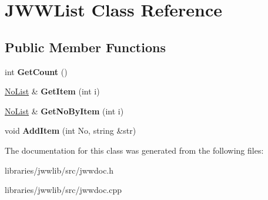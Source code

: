 \hypertarget{classJWWList}{\section{J\-W\-W\-List Class Reference}
\label{classJWWList}
}
\subsection*{Public Member Functions}
\begin{DoxyCompactItemize}
\item 
\hypertarget{classJWWList_af23137dc07751d737ea3837152284cf3}{int {\bfseries Get\-Count} ()}\label{classJWWList_af23137dc07751d737ea3837152284cf3}

\item 
\hypertarget{classJWWList_accb69e0d39b22f00d1a49da19d67a93f}{\hyperlink{struct__NoList}{No\-List} \& {\bfseries Get\-Item} (int i)}\label{classJWWList_accb69e0d39b22f00d1a49da19d67a93f}

\item 
\hypertarget{classJWWList_a7d163cbc45f06507ca9670d297b1ba22}{\hyperlink{struct__NoList}{No\-List} \& {\bfseries Get\-No\-By\-Item} (int i)}\label{classJWWList_a7d163cbc45f06507ca9670d297b1ba22}

\item 
\hypertarget{classJWWList_a5b74d319b4b833fb71075fa1c1f60dfa}{void {\bfseries Add\-Item} (int No, string \&str)}\label{classJWWList_a5b74d319b4b833fb71075fa1c1f60dfa}

\end{DoxyCompactItemize}


The documentation for this class was generated from the following files\-:\begin{DoxyCompactItemize}
\item 
libraries/jwwlib/src/jwwdoc.\-h\item 
libraries/jwwlib/src/jwwdoc.\-cpp\end{DoxyCompactItemize}
